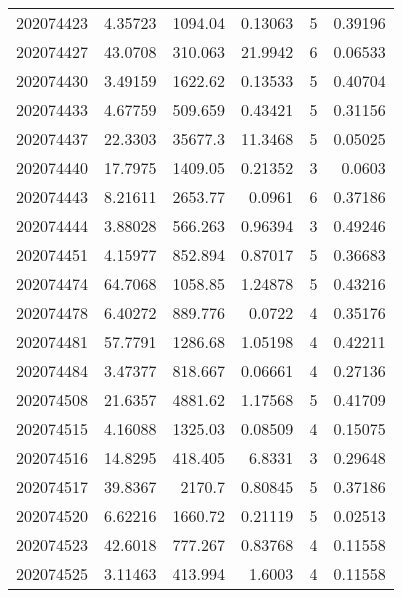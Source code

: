 \begin{tabular}{rrrrrr}
 202074423 &          4.35723 &     1094.04   &            0.13063 &           5 & 0.39196 \\
 202074427 &         43.0708  &      310.063  &           21.9942  &           6 & 0.06533 \\
 202074430 &          3.49159 &     1622.62   &            0.13533 &           5 & 0.40704 \\
 202074433 &          4.67759 &      509.659  &            0.43421 &           5 & 0.31156 \\
 202074437 &         22.3303  &    35677.3    &           11.3468  &           5 & 0.05025 \\
 202074440 &         17.7975  &     1409.05   &            0.21352 &           3 & 0.0603  \\
 202074443 &          8.21611 &     2653.77   &            0.0961  &           6 & 0.37186 \\
 202074444 &          3.88028 &      566.263  &            0.96394 &           3 & 0.49246 \\
 202074451 &          4.15977 &      852.894  &            0.87017 &           5 & 0.36683 \\
 202074474 &         64.7068  &     1058.85   &            1.24878 &           5 & 0.43216 \\
 202074478 &          6.40272 &      889.776  &            0.0722  &           4 & 0.35176 \\
 202074481 &         57.7791  &     1286.68   &            1.05198 &           4 & 0.42211 \\
 202074484 &          3.47377 &      818.667  &            0.06661 &           4 & 0.27136 \\
 202074508 &         21.6357  &     4881.62   &            1.17568 &           5 & 0.41709 \\
 202074515 &          4.16088 &     1325.03   &            0.08509 &           4 & 0.15075 \\
 202074516 &         14.8295  &      418.405  &            6.8331  &           3 & 0.29648 \\
 202074517 &         39.8367  &     2170.7    &            0.80845 &           5 & 0.37186 \\
 202074520 &          6.62216 &     1660.72   &            0.21119 &           5 & 0.02513 \\
 202074523 &         42.6018  &      777.267  &            0.83768 &           4 & 0.11558 \\
 202074525 &          3.11463 &      413.994  &            1.6003  &           4 & 0.11558 \\

\end{tabular}

